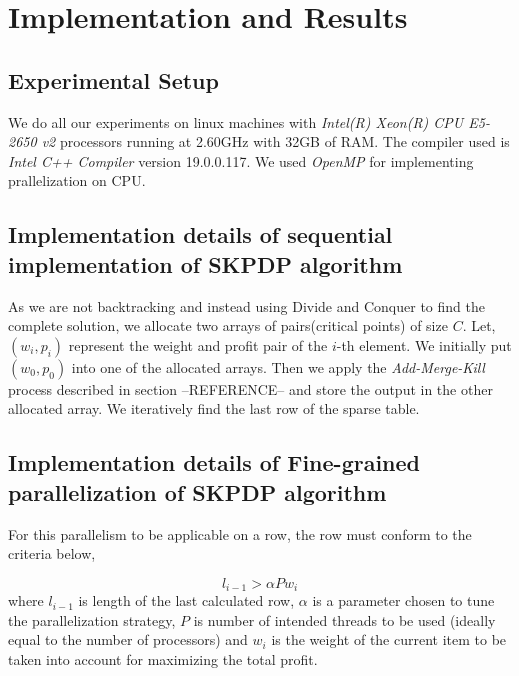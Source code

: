 \chapter{Implementation and Results}
\label{chap:implementation-results}

\section{Experimental Setup}
We do all our experiments on linux machines with \textit{Intel(R) Xeon(R) CPU E5-2650 v2} processors running at 2.60GHz with 32GB of RAM. The compiler used is \textit{Intel C++ Compiler} version 19.0.0.117. We used \textit{OpenMP } for implementing  prallelization on CPU.


\section{Implementation details of sequential implementation of SKPDP algorithm}
As we are not backtracking and instead using Divide and Conquer to find the complete solution, we allocate two arrays of pairs(critical points) of size $C$. Let, $(w_i,p_i)$ represent the weight and profit pair of the $i$-th element. We initially put $(w_0,p_0)$ into one of the allocated arrays. Then we apply the \textit{Add-Merge-Kill} process described in section --REFERENCE-- and store the output in the other allocated array. We iteratively find the last row of the sparse table.


\section{Implementation details of Fine-grained parallelization of SKPDP algorithm}
For this parallelism to be applicable on a row, the row must conform to the criteria below,

\begin{equation}
\label{eq: fine-grained-criteria}
l_{i-1} > \alpha P w_i
\end{equation}
where $l_{i-1}$ is length of the last calculated row, $\alpha$ is a parameter chosen to tune the parallelization strategy, $P$ is number of intended threads to be used (ideally equal to the number of processors) and $w_i$ is the weight of the current item to be taken into account for maximizing the total profit.

